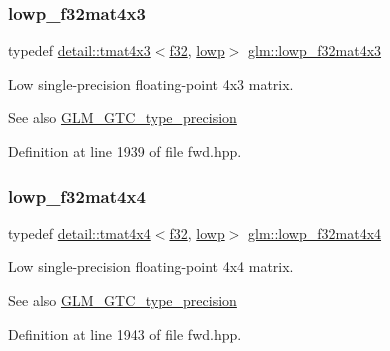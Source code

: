 \subsubsection{\texorpdfstring{lowp\+\_\+f32mat4x3}{lowp\_f32mat4x3}}
{\footnotesize\ttfamily typedef \hyperlink{structglm_1_1detail_1_1tmat4x3}{detail\+::tmat4x3}$<$\hyperlink{group__gtc__type__precision_ga0ec999b57f5330d9021256e96038df04}{f32}, \hyperlink{namespaceglm_a0f04f086094c747d227af4425893f545ae161af3fc695e696ce3bf69f7332bc2d}{lowp}$>$ \hyperlink{group__gtc__type__precision_gadd0ff5b09c6ecac83e4e908e3f6478c7}{glm\+::lowp\+\_\+f32mat4x3}}

Low single-\/precision floating-\/point 4x3 matrix. \begin{DoxySeeAlso}{See also}
\hyperlink{group__gtc__type__precision}{G\+L\+M\+\_\+\+G\+T\+C\+\_\+type\+\_\+precision} 
\end{DoxySeeAlso}


Definition at line 1939 of file fwd.\+hpp.

\mbox{\label{group__gtc__type__precision_gab7a6454e1f5d5c434ff316b139eb0231}} 
\subsubsection{\texorpdfstring{lowp\+\_\+f32mat4x4}{lowp\_f32mat4x4}}
{\footnotesize\ttfamily typedef \hyperlink{structglm_1_1detail_1_1tmat4x4}{detail\+::tmat4x4}$<$\hyperlink{group__gtc__type__precision_ga0ec999b57f5330d9021256e96038df04}{f32}, \hyperlink{namespaceglm_a0f04f086094c747d227af4425893f545ae161af3fc695e696ce3bf69f7332bc2d}{lowp}$>$ \hyperlink{group__gtc__type__precision_gab7a6454e1f5d5c434ff316b139eb0231}{glm\+::lowp\+\_\+f32mat4x4}}

Low single-\/precision floating-\/point 4x4 matrix. \begin{DoxySeeAlso}{See also}
\hyperlink{group__gtc__type__precision}{G\+L\+M\+\_\+\+G\+T\+C\+\_\+type\+\_\+precision} 
\end{DoxySeeAlso}


Definition at line 1943 of file fwd.\+hpp.

\mbox{\label{group__gtc__type__precision_ga83edc5f21bfa41f72f881b29aabbd919}} 
